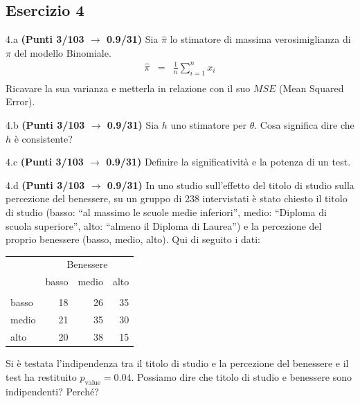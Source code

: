 \documentclass[
  11pt,
]{book}
\theoremstyle{mytheoremstyle}
\theoremstyle{mydefstyle}
\begin{document}
\subsection{Esercizio 4}\label{esercizio-4-23}

4.a \textbf{(Punti 3/103 \(\rightarrow\) 0.9/31)} Sia \(\hat \pi\) lo stimatore di massima verosimiglianza di \(\pi\) del modello Binomiale.
\begin{eqnarray*}
  \hat\pi &=&  \frac 1n\sum_{i=1}^nx_i\\
\end{eqnarray*}
Ricavare la sua varianza e metterla in relazione con il suo \(MSE\) (Mean Squared Error).

4.b \textbf{(Punti 3/103 \(\rightarrow\) 0.9/31)} Sia \(h\) uno stimatore per \(\theta\). Cosa significa dire che \(h\) è consistente?

4.c \textbf{(Punti 3/103 \(\rightarrow\) 0.9/31)} Definire la significatività e la potenza di un test.

4.d \textbf{(Punti 3/103 \(\rightarrow\) 0.9/31)} In uno studio sull'effetto del titolo di studio sulla percezione del benessere, su un gruppo di 238 intervistati è stato chiesto il titolo di studio (basso: ``al massimo le scuole medie inferiori'', medio: ``Diploma di scuola superiore'', alto: ``almeno il Diploma di Laurea'') e la percezione del proprio benessere (basso, medio, alto). Qui di seguito i dati:

\begin{table}[H]
\centering\centering
\begin{tabular}{lrrr}
\toprule
\multicolumn{1}{c}{ } & \multicolumn{3}{c}{Benessere} \\
\cmidrule(l{3pt}r{3pt}){2-4}
  & basso & medio & alto\\
\midrule
\addlinespace[0.3em]
\multicolumn{4}{l}{\textbf{Titolo di studio}}\\
\hspace{1em}basso & 18 & 26 & 35\\
\hspace{1em}medio & 21 & 35 & 30\\
\hspace{1em}alto & 20 & 38 & 15\\
\bottomrule
\end{tabular}
\end{table}

Si è testata l'indipendenza tra il titolo di studio e la percezione del benessere e il test ha restituito \(p_\text{value}=0.04\). Possiamo dire che titolo di studio e benessere sono indipendenti? Perché?
\end{document}
